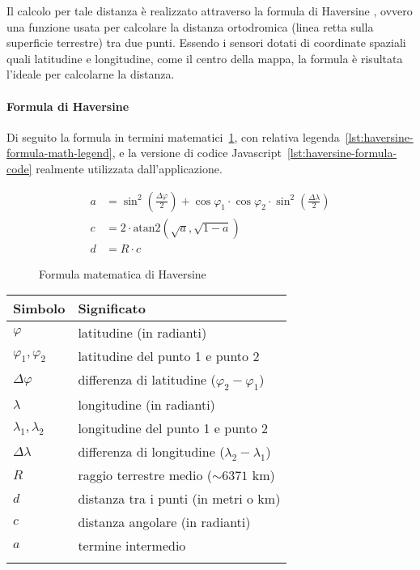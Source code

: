 Il calcolo per tale distanza è realizzato attraverso la formula di Haversine \cite{haversine_formula},
ovvero una funzione usata per calcolare la distanza ortodromica (linea retta sulla superficie terrestre) tra due punti.
Essendo i sensori dotati di coordinate spaziali quali latitudine e longitudine, come il centro della mappa,
la formula è risultata l'ideale per calcolarne la distanza.

\paragraph{Formula di Haversine}

Di seguito la formula in termini matematici~\ref{lst:haversine-formula-math},
con relativa legenda~\ref{lst:haversine-formula-math-legend}, e la versione
di codice Javascript~\ref{lst:haversine-formula-code} realmente utilizzata dall'applicazione.

\begin{figure}[h]
  \begin{align}
    a & = \sin^2\left(\frac{\Delta\varphi}{2}\right) + \cos\varphi_1 \cdot \cos\varphi_2 \cdot \sin^2\left(\frac{\Delta\lambda}{2}\right) \\
    c & = 2 \cdot \text{atan2}\left(\sqrt{a}, \sqrt{1-a}\right)                                                                           \\
    d & = R \cdot c
  \end{align}
  \caption{Formula matematica di Haversine}
  \label{lst:haversine-formula-math}
\end{figure}

\begin{tabular}{ll}
  \textbf{Simbolo}       & \textbf{Significato}                                \\
  \hline
  $\varphi$              & latitudine (in radianti)                            \\
  $\varphi_1, \varphi_2$ & latitudine del punto 1 e punto 2                    \\
  $\Delta\varphi$        & differenza di latitudine ($\varphi_2 - \varphi_1$)  \\
  $\lambda$              & longitudine (in radianti)                           \\
  $\lambda_1, \lambda_2$ & longitudine del punto 1 e punto 2                   \\
  $\Delta\lambda$        & differenza di longitudine ($\lambda_2 - \lambda_1$) \\
  $R$                    & raggio terrestre medio ($\sim 6371$ km)          \\
  $d$                    & distanza tra i punti (in metri o km)                \\
  $c$                    & distanza angolare (in radianti)                     \\
  $a$                    & termine intermedio                                  \\
  \label{lst:haversine-formula-math-legend}
\end{tabular}

